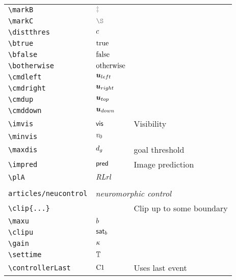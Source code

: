 \begin{longtable}{lll}
 {\color[rgb]{0.5,0.5,0.5}\texttt{\textbackslash markB}} & $\markB$ & \\ 
 {\color[rgb]{0.5,0.5,0.5}\texttt{\textbackslash markC}} & $\markC$ & \\ 
 {\color[rgb]{0.5,0.5,0.5}\texttt{\textbackslash distthres}} & $c$ & \\ 
 {\color[rgb]{0.5,0.5,0.5}\texttt{\textbackslash btrue}} & $\text{true}$ & \\ 
 {\color[rgb]{0.5,0.5,0.5}\texttt{\textbackslash bfalse}} & $\text{false}$ & \\ 
 {\color[rgb]{0.5,0.5,0.5}\texttt{\textbackslash botherwise}} & $\text{otherwise}$ & \\ 
 {\color[rgb]{0.5,0.5,0.5}\texttt{\textbackslash cmdleft}} & $\boldsymbol{u}_{left}$ & \\ 
 {\color[rgb]{0.5,0.5,0.5}\texttt{\textbackslash cmdright}} & $\boldsymbol{u}_{right}$ & \\ 
 {\color[rgb]{0.5,0.5,0.5}\texttt{\textbackslash cmdup}} & $\boldsymbol{u}_{top}$ & \\ 
 {\color[rgb]{0.5,0.5,0.5}\texttt{\textbackslash cmddown}} & $\boldsymbol{u}_{down}$ & \\ 
 {\color[rgb]{0.5,0.5,0.5}\texttt{\textbackslash imvis}} & $\mathsf{vis}$ &  Visibility\\ 
 {\color[rgb]{0.5,0.5,0.5}\texttt{\textbackslash minvis}} & $v_0$ & \\ 
 {\color[rgb]{0.5,0.5,0.5}\texttt{\textbackslash maxdis}} & $d_g$ &  goal threshold\\ 
 {\color[rgb]{0.5,0.5,0.5}\texttt{\textbackslash impred}} & $\mathsf{pred}$ &  Image prediction\\ 
 {\color[rgb]{0.5,0.5,0.5}\texttt{\textbackslash plA}} & $RLrl$ & \\ 
  &  & \\ 
 {\color[rgb]{0.5,0.5,0.5}\texttt{articles/neucontrol}} & \multicolumn{2}{l}{\emph{neuromorphic control}}\\ 
 \hline
{\color[rgb]{0.5,0.5,0.5}\texttt{\textbackslash clip\{...\}}} &  &  Clip up to some boundary \\ 
 {\color[rgb]{0.5,0.5,0.5}\texttt{\textbackslash maxu}} & $b$ & \\ 
 {\color[rgb]{0.5,0.5,0.5}\texttt{\textbackslash clipu}} & $\mathsf{sat}_{b}$ & \\ 
 {\color[rgb]{0.5,0.5,0.5}\texttt{\textbackslash gain}} & $\kappa$ & \\ 
 {\color[rgb]{0.5,0.5,0.5}\texttt{\textbackslash settime}} & $\mathbb{T}$ & \\ 
 {\color[rgb]{0.5,0.5,0.5}\texttt{\textbackslash controllerLast}} & $\text{C1}$ &  Uses last event\\ 

\end{longtable}
